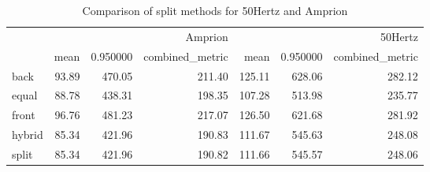 \begin{table}
\caption{Comparison of split methods for 50Hertz and Amprion}
\label{tab:appendix_a_block_comparison_results}
\begin{tabular}{lrrrrrr}
\toprule
 & \multicolumn{3}{r}{Amprion} & \multicolumn{3}{r}{50Hertz} \\
 & mean & 0.950000 & combined_metric & mean & 0.950000 & combined_metric \\
\midrule
back & 93.89 & 470.05 & 211.40 & 125.11 & 628.06 & 282.12 \\
equal & 88.78 & 438.31 & 198.35 & 107.28 & 513.98 & 235.77 \\
front & 96.76 & 481.23 & 217.07 & 126.50 & 621.68 & 281.92 \\
hybrid & 85.34 & 421.96 & 190.83 & 111.67 & 545.63 & 248.08 \\
split & 85.34 & 421.96 & 190.82 & 111.66 & 545.57 & 248.06 \\
\bottomrule
\end{tabular}
\end{table}

